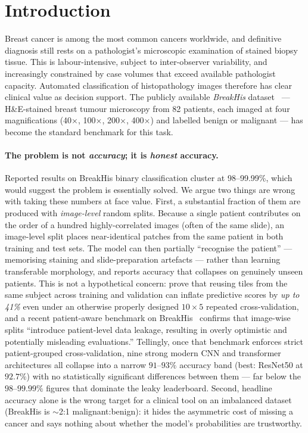 \documentclass[11pt]{article}
\begin{document}
\section{Introduction}
\label{sec:intro}

Breast cancer is among the most common cancers worldwide, and definitive
diagnosis still rests on a pathologist's microscopic examination of stained
biopsy tissue. This is labour-intensive, subject to inter-observer variability,
and increasingly constrained by case volumes that exceed available pathologist
capacity. Automated classification of histopathology images therefore has clear
clinical value as decision support. The publicly available \emph{BreakHis}
dataset~\citep{spanhol2016breakhis} — H\&E-stained breast tumour microscopy from
82 patients, each imaged at four magnifications (40$\times$, 100$\times$,
200$\times$, 400$\times$) and labelled benign or malignant — has become the
standard benchmark for this task.

\paragraph{The problem is not \emph{accuracy}; it is \emph{honest} accuracy.}
Reported results on BreakHis binary classification cluster at 98--99.99\%, which
would suggest the problem is essentially solved. We argue two things are wrong
with taking these numbers at face value. First, a substantial fraction of them
are produced with \emph{image-level} random splits. Because a single patient
contributes on the order of a hundred highly-correlated images (often of the same
slide), an image-level split places near-identical patches from the same patient
in both training and test sets. The model can then partially ``recognise the
patient'' — memorising staining and slide-preparation artefacts — rather than
learning transferable morphology, and reports accuracy that collapses on genuinely
unseen patients. This is not a hypothetical concern: \citet{bussola2020leakage}
prove that reusing tiles from the same subject across training and validation can
inflate predictive scores by \emph{up to 41\%} even under an otherwise properly
designed $10\times5$ repeated cross-validation, and a recent patient-aware
benchmark on BreakHis~\citep{priyanka2026patientaware} confirms that image-wise
splits ``introduce patient-level data leakage, resulting in overly optimistic and
potentially misleading evaluations.'' Tellingly, once that benchmark enforces
strict patient-grouped cross-validation, nine strong modern CNN and transformer
architectures all collapse into a narrow $91$--$93\%$ accuracy band (best: ResNet50
at $92.7\%$) with no statistically significant differences between them — far below
the $98$--$99.99\%$ figures that dominate the leaky leaderboard.
Second, headline accuracy alone is the wrong target for a clinical tool on an
imbalanced dataset (BreakHis is $\sim$2:1 malignant:benign): it hides the
asymmetric cost of missing a cancer and says nothing about whether the model's
probabilities are trustworthy.
\end{document}
